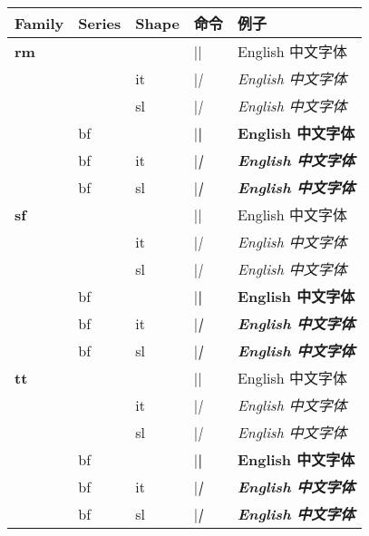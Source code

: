 \documentclass[cs4size,a4paper,fancyhdr,fntef,UTF8]{ctexbook}
\begin{document}
\begin{center}
\begin{tabular}{lllll}

\hline
 Family & Series & Shape & 命令 & 例子 \\ \hline
 {\bf rm} &    &    & |\rmfamily| &
                      {\rmfamily English 中文字体} \\
          &    & it & |\rmfamily\itshape| &
                      {\rmfamily\itshape English 中文字体} \\
          &    & sl & |\rmfamily\slshape| &
                      {\rmfamily\slshape English 中文字体} \\ \cline{2-5}
          & bf &    & |\rmfamily\bfseries| &
                      {\rmfamily\bfseries English 中文字体} \\
          & bf & it & |\rmfamily\bfseries\itshape| &
                      {\rmfamily\bfseries\itshape English 中文字体} \\
          & bf & sl & |\rmfamily\bfseries\slshape| &
                      {\rmfamily\bfseries\slshape English 中文字体} \\ \hline

 {\bf sf} &    &    & |\sffamily| &
                      {\sffamily English 中文字体} \\
          &    & it & |\sffamily\itshape| &
                      {\sffamily\itshape English 中文字体} \\
          &    & sl & |\sffamily\slshape| &
                      {\sffamily\slshape English 中文字体} \\ \cline{2-5}
          & bf &    & |\sffamily\bfseries| &
                      {\sffamily\bfseries English 中文字体} \\
          & bf & it & |\sffamily\bfseries\itshape| &
                      {\sffamily\bfseries\itshape English 中文字体} \\
          & bf & sl & |\sffamily\bfseries\slshape| &
                      {\sffamily\bfseries\slshape English 中文字体} \\ \hline

 {\bf tt} &    &    & |\ttfamily| &
                      {\ttfamily English 中文字体} \\
          &    & it & |\ttfamily\itshape| &
                      {\ttfamily\itshape English 中文字体} \\
          &    & sl & |\ttfamily\slshape| &
                      {\ttfamily\slshape English 中文字体} \\ \cline{2-5}
          & bf &    & |\ttfamily\bfseries| &
                      {\ttfamily\bfseries English 中文字体} \\
          & bf & it & |\ttfamily\bfseries\itshape| &
                      {\ttfamily\bfseries\itshape English 中文字体} \\
          & bf & sl & |\ttfamily\bfseries\slshape| &
                      {\ttfamily\bfseries\slshape English 中文字体} \\ \hline
\end{tabular}
\end{center}
\end{document}
